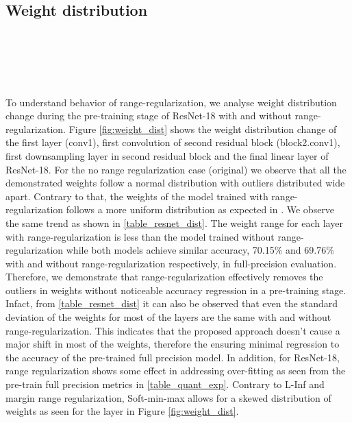 \documentclass[10pt,twocolumn,letterpaper]{article}
\begin{document}
\subsection{Weight distribution}

\begin{figure*}[t]
\\
\\
\\
\\
\caption{Weight distribution of various layers of ResNet-18 during training time using no range regularization and the proposed methods. Final weight distributions of fc layer with R\_SMM  loss regularizer shows that it can produce non-zero centered distributions.}
\label{fig:weight_dist}
\end{figure*}


To understand behavior of range-regularization, we analyse weight distribution change during the pre-training stage of ResNet-18 with and without range-regularization. Figure \ref{fig:weight_dist} shows the weight distribution change of the first layer (conv1), first convolution of second residual block (block2.conv1), first downsampling layer in second residual block and the final linear layer of ResNet-18. For the no range regularization case (original) we observe that all the demonstrated weights follow a normal distribution with outliers distributed wide apart. Contrary to that, the weights of the model trained with range-regularization follows a more uniform distribution as expected in \cite{kure}. We observe the same trend as shown in \cref{table_resnet_dist}. The weight range for each layer with range-regularization is less than the model trained without range-regularization while both models achieve similar accuracy, 70.15\% and 69.76\%  with and without range-regularization respectively, in full-precision evaluation. Therefore, we demonstrate that range-regularization effectively removes the outliers in weights without noticeable accuracy regression in a pre-training stage. Infact, from \cref{table_resnet_dist} it can also be observed that even the standard deviation of the weights for most of the layers are the same with and without range-regularization. This indicates that the proposed approach doesn't cause a major shift in most of the weights, therefore the ensuring minimal regression to the accuracy of the pre-trained full precision model. In addition, for ResNet-18, range regularization shows some effect in addressing over-fitting as seen from the pre-train full precision metrics in \cref{table_quant_exp}. Contrary to L-Inf and margin range regularization, Soft-min-max allows for a skewed distribution of weights as seen for the  layer in Figure \ref{fig:weight_dist}.
\end{document}
